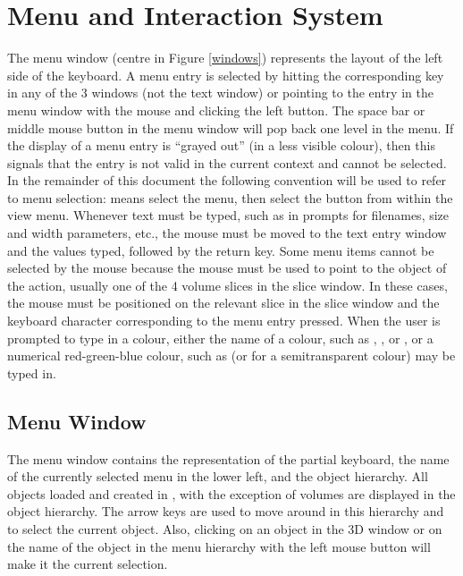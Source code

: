 \section{Menu and Interaction System}

The menu window (centre in Figure \ref{windows}) represents the layout
of the left side of the keyboard.  A menu entry is selected by hitting the
corresponding key in any of the 3 \display windows (not the text window)
or pointing to the entry
in the menu window with the mouse and clicking the left button.
The space bar or middle mouse
button in the menu window will pop back one level in the menu.  If the
display of a menu
entry is ``grayed out'' (in a less visible colour), then this signals that the
entry is not valid in the current context and cannot be selected.  In the
remainder of this document
the following convention will be used to refer to menu selection:
 means select the  menu, then
select the  button
from within the view menu.  Whenever text must be typed, such as in prompts
for filenames, size and width parameters, etc., the mouse must be moved to the
text entry window and the values typed, followed by the return key.
Some menu items cannot be selected by the mouse because the mouse must be
used to point to the object of the action, usually one of the 4 volume slices
in the slice window.
In these cases, the mouse must be positioned on the relevant slice in
the slice window and the
keyboard character corresponding to the menu entry pressed.
When the user is prompted to type in a colour, either the name of a colour,
such as , , or , or a numerical
red-green-blue colour,
such as \mbox{} (or \mbox{} for
a semitransparent colour) may be typed in.

\subsection{Menu Window}

The menu window contains the representation of the partial keyboard, 
the name of the currently selected menu in the lower left, and
the object hierarchy.  All objects loaded and created in \display,
with the exception of volumes are displayed in the object hierarchy.  The
arrow keys are used to move around in this hierarchy and to select the
current object.  Also, clicking on an object in the 3D window or on the
name of the object in the menu hierarchy with the left mouse button
will make it the current selection.

